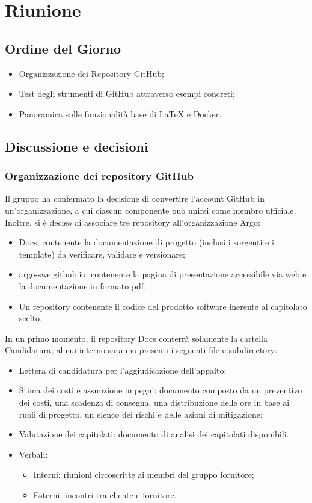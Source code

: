 \section{Riunione}
\subsection{Ordine del Giorno}
\begin{itemize}
	\item Organizzazione dei Repository GitHub;
	\item Test degli strumenti di GitHub attraverso esempi concreti;
	\item Panoramica sulle funzionalità base di LaTeX e Docker.
\end{itemize}

\subsection{Discussione e decisioni}

\subsubsection{Organizzazione dei repository GitHub}
Il gruppo ha confermato la decisione di convertire l'account GitHub in un'organizzazione, a cui ciascun componente può unirsi come membro ufficiale. Inoltre, si è deciso di associare tre repository all'organizzazione Argo:
\begin{itemize}
	\item Docs, contenente la documentazione di progetto (inclusi i sorgenti e i template) da verificare, validare e versionare;
	\item argo-swe.github.io, contenente la pagina di presentazione accessibile via web e la documentazione in formato pdf;
	\item Un repository contenente il codice del prodotto software inerente al capitolato scelto.
\end{itemize}

In un primo momento, il repository Docs conterrà solamente la cartella Candidatura, al cui interno saranno presenti i seguenti file e subdirectory:
\begin{itemize}
	\item Lettera di candidatura per l’aggiudicazione dell’appalto;
	\item Stima dei costi e assunzione impegni: documento composto da un preventivo dei costi, una scadenza di consegna, una distribuzione delle ore in base ai ruoli di progetto, un elenco dei rischi e delle azioni di mitigazione;
	\item Valutazione dei capitolati: documento di analisi dei capitolati disponibili.
	\item Verbali:
		\begin{itemize}
			\item Interni: riunioni circoscritte ai membri del gruppo fornitore;
			\item Esterni: incontri tra cliente e fornitore.
		\end{itemize}
\end{itemize}

